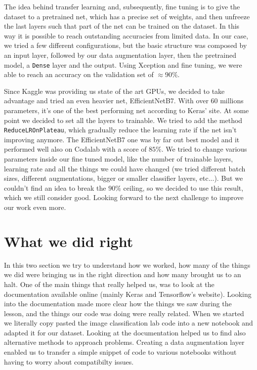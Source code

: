\documentclass[a4paper,12pt]{article}
\newcommand{\code}[1]{\texttt{#1}}
\numberwithin{equation}{section}
\begin{document}
The idea behind transfer learning and, subsequently, fine tuning is to give the dataset to a pretrained net, which has a precise set of weights, and then unfreeze the last layers such that part of the net can be trained on the dataset. In this way it is possible to reach outstanding accuracies from limited data. In our case, we tried a few different configurations, but the basic structure was composed by an input layer, followed by our data augmentation layer, then the pretrained model, a \code{Dense} layer and the output. Using Xception and fine tuning, we were able to reach an accuracy on the validation set of \(\approx 90\%\). 

Since Kaggle was providing us state of the art GPUs, we decided to take advantage and tried an even heavier net, EfficientNetB7. With over \(60\) millions parameters, it's one of the best performing net according to Keras' site. At some point we decided to set all the layers to trainable. We tried to add the method \code{ReduceLROnPlateau}, which gradually reduce the learning rate if the net isn't improving anymore. The EfficientNetB7 one was by far out best model and it performed well also on Codalab with a score of \(85\%\). We tried to change various parameters inside our fine tuned model, like the number of trainable layers, learning rate and all the things we could have changed (we tried different batch sizes, different augmentations, bigger or smaller classifier layers, etc...). But we couldn't find an idea to break the \(90\%\) ceiling, so we decided to use this result, which we still consider good. Looking forward to the next challenge to improve our work even more.
\section*{What we did right}
In this two section we try to understand how we worked, how many of the things we did were bringing us in the right direction and how many brought us to an halt. One of the main things that really helped us, was to look at the documentation available online (mainly Keras and Tensorflow's website). Looking into the documentation made more clear how the things we saw during the lesson, and the things our code was doing were really related. When we started we literally copy pasted the image classification lab code into a new notebook and adapted it for our dataset. Looking at the documentation helped us to find also alternative methods to approach problems. Creating a data augmentation layer enabled us to transfer a simple snippet of code to various notebooks without having to worry about compatibilty issues. 
\end{document}
